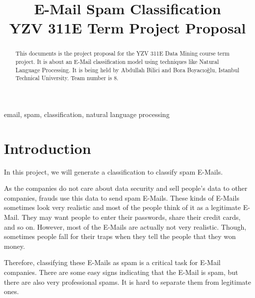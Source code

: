 \documentclass[conference]{IEEEtran}
\begin{document}
\title{E-Mail Spam Classification\\
{\Large YZV 311E Term Project Proposal}
}

\author{
\and
{}
}

\maketitle

\begin{abstract}
This documents is the project proposal for the YZV 311E Data Mining course term project. It is about an E-Mail classification model using techniques like Natural Language Processing. It is being held by Abdullah Bilici and Bora Boyacıoğlu, Istanbul Technical University. Team number is 8.
\end{abstract}

\begin{IEEEkeywords}
email, spam, classification, natural language processing
\end{IEEEkeywords}

\section{Introduction}
In this project, we will generate a classification to classify spam E-Mails.

As the companies do not care about data security and sell people's data to other companies, frauds use this data to send spam E-Mails. These kinds of E-Mails sometimes look very realistic and most of the people think of it as a legitimate E-Mail. They may want people to enter their passwords, share their credit cards, and so on. However, most of the E-Mails are actually not very realistic. Though, sometimes people fall for their traps when they tell the people that they won money.

Therefore, classifying these E-Mails as spam is a critical task for E-Mail companies. There are some easy signs indicating that the E-Mail is spam, but there are also very professional spams. It is hard to separate them from legitimate ones.
\end{document}
